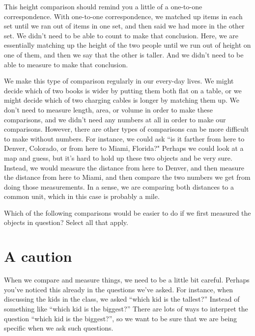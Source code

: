 \documentclass{ximera}
\begin{document}
This height comparison should remind you a little of a one-to-one correspondence. With one-to-one correspondence, we matched up items in each set until we ran out of items in one set, and then said we had more in the other set. We didn't need to be able to count to make that conclusion. Here, we are essentially matching up the height of the two people until we run out of height on one of them, and then we say that the other is taller. And we didn't need to be able to measure to make that conclusion.

We make this type of comparison regularly in our every-day lives. We might decide which of two books is wider by putting them both flat on a table, or we might decide which of two charging cables is longer by matching them up. We don't need to measure length, area, or volume in order to make these comparisons, and we didn't need any numbers at all in order to make our comparisons. However, there are other types of comparisons can be more difficult to make without numbers. For instance, we could ask ``is it farther from here to Denver, Colorado, or from here to Miami, Florida?" Perhaps we could look at a map and guess, but it's hard to hold up these two objects and be very sure. Instead, we would measure the distance from here to Denver, and then measure the distance from here to Miami, and then compare the two numbers we get from doing those measurements. In a sense, we are comparing both distances to a common unit, which in this case is probably a mile.

\begin{question}
Which of the following comparisons would be easier to do if we first measured the objects in question? Select all that apply.
\begin{selectAll}
\end{selectAll}
\end{question}

\section{A caution}
When we compare and measure things, we need to be a little bit careful. Perhaps you've noticed this already in the questions we've asked. For instance, when discussing the kids in the class, we asked ``which kid is the tallest?'' Instead of something like ``which kid is the biggest?'' There are lots of ways to interpret the question ``which kid is the biggest?'', so we want to be sure that we are being specific when we ask such questions.
\end{document}
